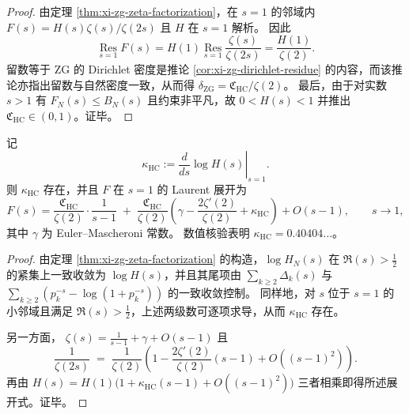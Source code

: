 \begin{proof}
由定理 \ref{thm:xi-zg-zeta-factorization}，在 \(s=1\) 的邻域内
\(
F(s)=H(s)\zeta(s)/\zeta(2s)
\)
且 \(H\) 在 \(s=1\) 解析。
因此
\[
\operatorname*{Res}_{s=1}F(s)
=H(1)\operatorname*{Res}_{s=1}\frac{\zeta(s)}{\zeta(2s)}
=\frac{H(1)}{\zeta(2)}.
\]
留数等于 \(\mathrm{ZG}\) 的 Dirichlet 密度是推论 \ref{cor:xi-zg-dirichlet-residue} 的内容，而该推论亦指出留数与自然密度一致，从而得 \(\delta_{\mathrm{ZG}}=\mathfrak C_{\mathrm{HC}}/\zeta(2)\)。
最后，由于对实数 \(s>1\) 有 \(F_N(s)\le B_N(s)\) 且约束非平凡，故 \(0<H(s)<1\) 并推出 \(\mathfrak C_{\mathrm{HC}}\in(0,1)\)。证毕。
\end{proof}

\begin{proposition}[\texorpdfstring{$s=1$}{s=1} 的 Laurent 展开与 Euler--Kronecker 型常数]\label{prop:xi-zg-hardcore-laurent}
记
\[
\kappa_{\mathrm{HC}}:=\left.\frac{d}{ds}\log H(s)\right|_{s=1}.
\]
则 \(\kappa_{\mathrm{HC}}\) 存在，并且 \(F\) 在 \(s=1\) 的 Laurent 展开为
\[
F(s)=\frac{\mathfrak C_{\mathrm{HC}}}{\zeta(2)}\cdot\frac{1}{s-1}
\;+\;
\frac{\mathfrak C_{\mathrm{HC}}}{\zeta(2)}
\left(\gamma-\frac{2\zeta'(2)}{\zeta(2)}+\kappa_{\mathrm{HC}}\right)
 + O(s-1),
\qquad s\to 1,
\]
其中 \(\gamma\) 为 Euler--Mascheroni 常数。
数值核验表明 \(\kappa_{\mathrm{HC}}=0.40404\ldots\)。
\end{proposition}

\begin{proof}
由定理 \ref{thm:xi-zg-zeta-factorization} 的构造，\(\log H_N(s)\) 在 \(\Re(s)>\tfrac12\) 的紧集上一致收敛为 \(\log H(s)\)，并且其尾项由 \(\sum_{k\ge 2}\Delta_k(s)\) 与 \(\sum_{k\ge 2}(p_k^{-s}-\log(1+p_k^{-s}))\) 的一致收敛控制。
同样地，对 \(s\) 位于 \(s=1\) 的小邻域且满足 \(\Re(s)>\tfrac12\)，上述两级数可逐项求导，从而 \(\kappa_{\mathrm{HC}}\) 存在。

另一方面，
\(
\zeta(s)=\frac1{s-1}+\gamma+O(s-1)
\)
且
\[
\frac{1}{\zeta(2s)}
\;=\;
\frac{1}{\zeta(2)}
\left(1-\frac{2\zeta'(2)}{\zeta(2)}(s-1)+O((s-1)^2)\right).
\]
再由
\(
H(s)=H(1)\bigl(1+\kappa_{\mathrm{HC}}(s-1)+O((s-1)^2)\bigr)
\)
三者相乘即得所述展开式。证毕。
\end{proof}



